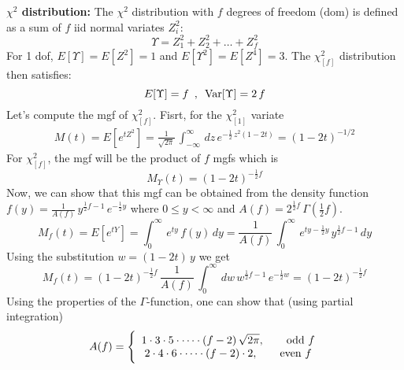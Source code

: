 \documentclass[aps,prl,preprint,superscriptaddress]{revtex4-1}
\begin{document}
\vspace{0.5cm}

{\bf $\chi^2$ distribution:} The $\chi^2$ distribution with $f$ degrees of freedom (dom) is defined as a 
sum of $f$ iid normal variates $Z_i^2$:
%
\begin{equation}
\Upsilon = Z_1^2 + Z_2^2 + \dots + Z_f^2
\end{equation}
%
For 1 dof, $E[\Upsilon] = E[Z^2] = 1$ and $E[\Upsilon^2] = E[Z^4] = 3$. The $\chi^2_{[f]}$ distribution then satisfies:
%
\begin{equation}
E[\Upsilon] = f \,\,\, , \,\,\, {\rm Var}[\Upsilon] = 2\, f
\end{equation}
%
Let's compute the mgf of $\chi^2_{[f]}$. Fisrt, for the $\chi^2_{[1]}$ variate
%
\begin{eqnarray}
M(t) = E[e^{tZ^2}] = \frac{1}{\sqrt{2\pi}}\, \int_{-\infty}^{\infty}\, dz\, e^{-\frac{1}{2}\, z^2(1-2t)}
     = (1-2t)^{-1/2}
\end{eqnarray}
%
For $\chi^2_{[f]}$, the mgf will be the product of $f$ mgfs which is 
%
\begin{equation}
M_{\Upsilon}(t) = (1-2t)^{-\frac{1}{2} f}
\end{equation}
%
Now, we can show that this mgf can be obtained from the density function 
$f(y) = \frac{1}{A(f)}\, y^{\frac{1}{2}f-1}\, e^{-\frac{1}{2} y}$ where $0 \leq y < \infty$ and 
$A(f) = 2^{\frac{1}{2}f}\, \Gamma(\frac{1}{2}f)$. 
%
\begin{equation}
M_f(t) = E[e^{tY}] = \int_0^{\infty}\, e^{ty}\, f(y)\, dy = \frac{1}{A(f)}\, \int_0^{\infty}\, e^{ty-\frac{1}{2}y}\,
                     y^{\frac{1}{2}f-1}\, dy
\end{equation}
%
Using the substitution $w = (1-2t)\, y$ we get
%
\begin{equation}
M_f(t) = (1-2t)^{-\frac{1}{2}f}\, \frac{1}{A(f)}\, \int_0^{\infty}\, dw\, w^{\frac{1}{2}f-1}\, e^{-\frac{1}{2}w} 
       = (1-2t)^{-\frac{1}{2}f}
\end{equation}
%
Using the properties of the $\Gamma$-function, one can show that (using partial integration)
%
\begin{equation}
A(f) = \Bigg\{ \begin{array}{c} 1 \cdot 3 \cdot 5 \cdot \dots \cdot (f-2)\, \sqrt{2\pi} , \qquad {\rm odd}\,\, f \\
                                2 \cdot 4 \cdot 6 \cdot \dots \cdot (f-2) \cdot 2, \qquad {\rm even}\,\, f
       \end{array}
\end{equation}
%
\end{document}
